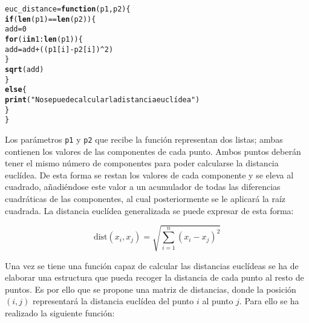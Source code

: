 \documentclass[12pt]{report}\usepackage[]{graphicx}\usepackage[dvipsnames]{xcolor}
\makeatletter
\newcommand{\hlnum}[1]{\textcolor[rgb]{0.686,0.059,0.569}{#1}}%
\newcommand{\hlstr}[1]{\textcolor[rgb]{0.192,0.494,0.8}{#1}}%
\newcommand{\hlopt}[1]{\textcolor[rgb]{0,0,0}{#1}}%
\newcommand{\hlstd}[1]{\textcolor[rgb]{0.345,0.345,0.345}{#1}}%
\newcommand{\hlkwa}[1]{\textcolor[rgb]{0.161,0.373,0.58}{\textbf{#1}}}%
\newcommand{\hlkwb}[1]{\textcolor[rgb]{0.69,0.353,0.396}{#1}}%
\newcommand{\hlkwc}[1]{\textcolor[rgb]{0.333,0.667,0.333}{#1}}%
\newcommand{\hlkwd}[1]{\textcolor[rgb]{0.737,0.353,0.396}{\textbf{#1}}}%
\newenvironment{kframe}{%
 \def\at@end@of@kframe{}%
 \ifinner\ifhmode%
  \def\at@end@of@kframe{\end{minipage}}%
  \begin{minipage}{\columnwidth}%
 \fi\fi%
 \def\FrameCommand##1{\hskip\@totalleftmargin \hskip-\fboxsep
 \colorbox{shadecolor}{##1}\hskip-\fboxsep
     \hskip-\linewidth \hskip-\@totalleftmargin \hskip\columnwidth}%
 \MakeFramed {\advance\hsize-\width
   \@totalleftmargin\z@ \linewidth\hsize
   \@setminipage}}%
 {\par\unskip\endMakeFramed%
 \at@end@of@kframe}
\newenvironment{knitrout}{}{} %
\newcommand{\dt}{\text{dist}}
\makeatother
\begin{document}
\begin{knitrout}
\color{fgcolor}\begin{kframe}
\begin{alltt}
\hlstd{euc_distance} \hlkwb{=} \hlkwa{function}\hlstd{(}\hlkwc{p1}\hlstd{,}\hlkwc{p2}\hlstd{)\{}
        \hlkwa{if}\hlstd{(}\hlkwd{len}\hlstd{(p1)} \hlopt{==} \hlkwd{len}\hlstd{(p2))\{}
                \hlstd{add} \hlkwb{=} \hlnum{0}
                \hlkwa{for}\hlstd{(i} \hlkwa{in} \hlnum{1}\hlopt{:}\hlkwd{len}\hlstd{(p1))\{}
                        \hlstd{add} \hlkwb{=} \hlstd{add} \hlopt{+} \hlstd{((p1[i]} \hlopt{-} \hlstd{p2[i])}\hlopt{^}\hlnum{2}\hlstd{)}
                \hlstd{\}}
                \hlkwd{sqrt}\hlstd{(add)}
        \hlstd{\}}
        \hlkwa{else} \hlstd{\{}
                \hlkwd{print}\hlstd{(}\hlstr{"No se puede calcular la distancia euclídea"}\hlstd{)}
        \hlstd{\}}
\hlstd{\}}
\end{alltt}
\end{kframe}
\end{knitrout}
					
					Los parámetros \texttt{p1} y \texttt{p2} que recibe la función representan dos listas; ambas contienen los valores de las componentes de cada punto. Ambos puntos deberán tener el mismo número de componentes para poder calcularse la distancia euclídea. De esta forma se restan los valores de cada componente y se eleva al cuadrado, añadiéndose este valor a un acumulador de todas las diferencias cuadráticas de las componentes, al cual posteriormente se le aplicará la raíz cuadrada. La distancia euclídea generalizada se puede expresar de esta forma:
					
					$$
					\dt(x_i, x_j) = \sqrt{\sum_{i=1}^n (x_i-x_j)^2}
					$$
					
					Una vez se tiene una función capaz de calcular las distancias euclídeas se ha de elaborar una estructura que pueda recoger la distancia de cada punto al resto de puntos. Es por ello que se propone una matriz de distancias, donde la posición $(i,j)$ representará la distancia euclídea del punto $i$ al punto $j$.
					Para ello se ha realizado la siguiente función:
					
\end{document}
